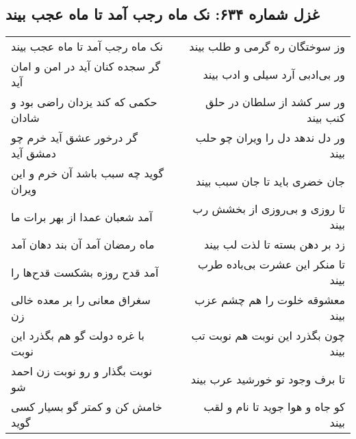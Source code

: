 \begin{center}
\section*{غزل شماره ۶۳۴: نک ماه رجب آمد تا ماه عجب بیند}
\label{sec:0634}
\begin{longtable}{l p{0.5cm} r}
نک ماه رجب آمد تا ماه عجب بیند
&&
وز سوختگان ره گرمی و طلب بیند
\\
گر سجده کنان آید در امن و امان آید
&&
ور بی‌ادبی آرد سیلی و ادب بیند
\\
حکمی که کند یزدان راضی بود و شادان
&&
ور سر کشد از سلطان در حلق کنب بیند
\\
گر درخور عشق آید خرم چو دمشق آید
&&
ور دل ندهد دل را ویران چو حلب بیند
\\
گوید چه سبب باشد آن خرم و این ویران
&&
جان خضری باید تا جان سبب بیند
\\
آمد شعبان عمدا از بهر برات ما
&&
تا روزی و بی‌روزی از بخشش رب بیند
\\
ماه رمضان آمد آن بند دهان آمد
&&
زد بر دهن بسته تا لذت لب بیند
\\
آمد قدح روزه بشکست قدح‌ها را
&&
تا منکر این عشرت بی‌باده طرب بیند
\\
سغراق معانی را بر معده خالی زن
&&
معشوقه خلوت را هم چشم عزب بیند
\\
با غره دولت گو هم بگذرد این نوبت
&&
چون بگذرد این نوبت هم نوبت تب بیند
\\
نوبت بگذار و رو نوبت زن احمد شو
&&
تا برف وجود تو خورشید عرب بیند
\\
خامش کن و کمتر گو بسیار کسی گوید
&&
کو جاه و هوا جوید تا نام و لقب بیند
\\
\end{longtable}
\end{center}
